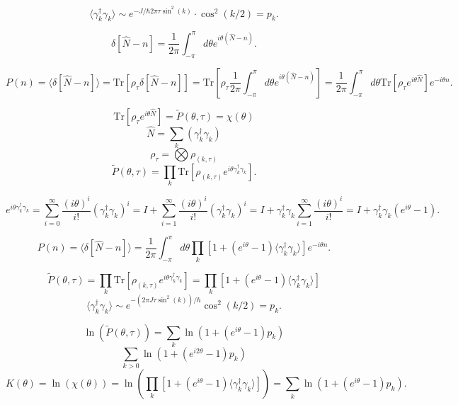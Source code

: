 \documentclass{article}
\begin{document}
\[
    \langle \gamma_k^\dagger \gamma_k \rangle \sim e^{-J/\hbar 2\pi\tau \sin^2(k)} \cdot \cos^2(k/2) = p_k.
\]

\[
    \delta[\hat{N} - n] = \frac{1}{2\pi} \int_{-\pi}^{\pi} d\theta e^{i\theta(\hat{N} - n)}.
\]

\[
    P(n) = \langle \delta[\hat{N}-n] \rangle = \mathrm{Tr}[\rho_{\tau} \delta[\hat{N}-n]] = \mathrm{Tr}[\rho_{\tau} \frac{1}{2\pi} \int_{-\pi}^{\pi} d\theta e^{i\theta(\hat{N}-n)}] = \frac{1}{2\pi} \int_{-\pi}^{\pi} d\theta \mathrm{Tr}[\rho_{\tau} e^{i\theta\hat{N}}] e^{-i\theta n}.
\]

\[
    \mathrm{Tr}[\rho_{\tau} e^{i\theta\hat{N}}] = \tilde{P}(\theta,\tau) = \chi(\theta)
\]
\[
    \hat{N} = \sum_k (\gamma_k^{\dagger} \gamma_k)
\]
\[
    \rho_{\tau} = \bigotimes \rho_{(k,\tau)}
\]
\[
    \tilde{P}(\theta,\tau) = \prod_k \mathrm{Tr}[\rho_{(k,\tau)} e^{i\theta\gamma_k^{\dagger} \gamma_k}].
\]

\[
    e^{i\theta\gamma_k^{\dagger} \gamma_k} = \sum_{i=0}^{\infty} \frac{(i\theta)^i}{i!} (\gamma_k^{\dagger} \gamma_k)^i = I + \sum_{i=1}^{\infty} \frac{(i\theta)^i}{i!} (\gamma_k^{\dagger} \gamma_k)^i = I + \gamma_k^{\dagger} \gamma_k \sum_{i=1}^{\infty} \frac{(i\theta)^i}{i!} = I + \gamma_k^{\dagger} \gamma_k (e^{i\theta}-1).
\]

\[
    P(n) = \langle \delta[\hat{N}-n] \rangle = \frac{1}{2\pi} \int_{-\pi}^{\pi} d\theta \prod_k [1+(e^{i\theta}-1)\langle \gamma_k^{\dagger} \gamma_k \rangle] e^{-i\theta n}.
\]

\[
    \tilde{P}(\theta,\tau) = \prod_k \mathrm{Tr}[\rho_{(k,\tau)} e^{i\theta\gamma_k^{\dagger} \gamma_k}] = \prod_k [1+(e^{i\theta}-1)\langle \gamma_k^{\dagger} \gamma_k \rangle]
\]
\[
    \langle \gamma_k^{\dagger} \gamma_k \rangle \sim e^{-(2\pi J\tau\sin^2(k))/\hbar} \cos^2(k/2) = p_k.
\]

\begin{equation}
    \ln(\tilde{P}(\theta,\tau)) = \sum_k \ln(1+(e^{i\theta}-1)p_k)
\end{equation}
\begin{equation}
    \sum_{k>0}\ln(1+(e^{i2\theta}-1)p_k)
\end{equation}
\begin{equation}
    K(\theta) = \ln(\chi(\theta)) = \ln\left(\prod_k [1+(e^{i\theta}-1)\langle \gamma_k^{\dagger} \gamma_k \rangle]\right) = \sum_k \ln(1+(e^{i\theta}-1)p_k).
\end{equation}
\end{document}
